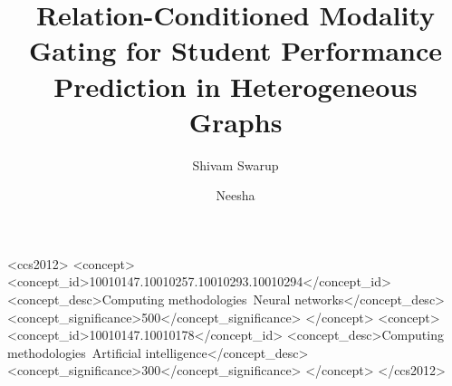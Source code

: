 \documentclass[sigconf,review]{acmart}
\begin{document}
\title{Relation-Conditioned Modality Gating for Student
Performance Prediction in Heterogeneous Graphs}

\author{Shivam Swarup}

\author{Neesha}

\begin{CCSXML}
<ccs2012>
  <concept>
    <concept_id>10010147.10010257.10010293.10010294</concept_id>
    <concept_desc>Computing methodologies~Neural networks</concept_desc>
    <concept_significance>500</concept_significance>
  </concept>
  <concept>
    <concept_id>10010147.10010178</concept_id>
    <concept_desc>Computing methodologies~Artificial intelligence</concept_desc>
    <concept_significance>300</concept_significance>
  </concept>
</ccs2012>
\end{CCSXML}


\end{document}
